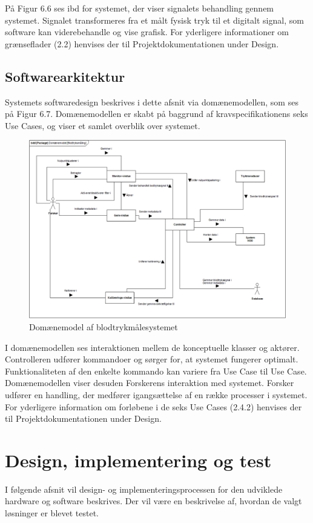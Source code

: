 På Figur 6.6 ses ibd for systemet, der viser signalets behandling gennem systemet. Signalet transformeres fra et målt fysisk tryk til et digitalt signal, som software kan viderebehandle og vise grafisk. For yderligere informationer om grænseflader (2.2) henvises der til Projektdokumentationen under Design. 
\subsection{Softwarearkitektur}
Systemets softwaredesign beskrives i dette afsnit via domænemodellen, som ses på Figur 6.7. Domænemodellen er skabt på baggrund af kravspecifikationens seks Use Cases, og viser et samlet overblik over systemet. 
\begin{figure}[H]
	\centering
	\includegraphics[width=1\textwidth]{Figurer/dm}
	\caption{Domænemodel af blodtrykmålesystemet}
\end{figure}
I domænemodellen ses interaktionen mellem de konceptuelle klasser og aktører. Controlleren udfører kommandoer og sørger for, at systemet fungerer optimalt. Funktionaliteten af den enkelte kommando kan variere fra Use Case til Use Case. Domænemodellen viser desuden Forskerens interaktion med systemet. Forsker udfører en handling, der medfører igangsættelse af en række processer i systemet. 
For yderligere information om forløbene i de seks Use Cases (2.4.2) henvises der til Projektdokumentationen under Design. 


\section{Design, implementering og test}
I følgende afsnit vil design- og implementeringsprocessen for den udviklede hardware og software beskrives. Der vil være en beskrivelse af, hvordan de valgt løsninger er blevet testet. 

